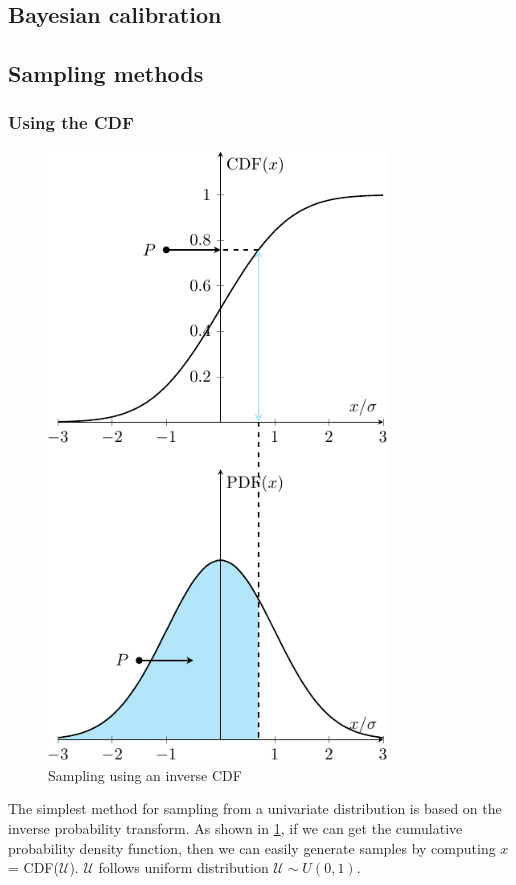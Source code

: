 \subsection{Bayesian calibration}

\subsection{Sampling methods}

\subsubsection{Using the CDF}

\begin{figure}[H]
    \centering
    \includegraphics[width = 90mm]{Figures/figure-CDF.pdf}
    \caption{Sampling using an inverse CDF}
    \label{fig: CDF}
\end{figure}

The simplest method for sampling from a univariate distribution is based on the inverse probability transform. As shown in \cref{fig: CDF}, if we can get the cumulative probability density function, then we can easily generate samples by computing $x$ = CDF($\mathcal{U}$). $\mathcal{U}$ follows uniform distribution $\mathcal{U} \sim U(0,1)$.




